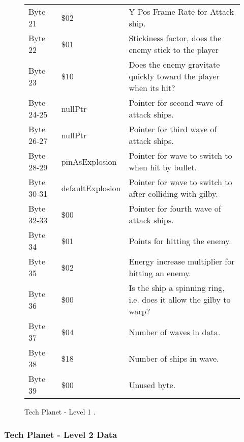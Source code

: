 \begin{figure}[H]
{\begin{adjustbox}{width=12cm}
\begin{tabular}{lll}
 Byte 21    & \$02               & Y Pos Frame Rate for Attack ship.                                   \\
 Byte 22    & \$01               & Stickiness factor, does the enemy stick to the player               \\
 Byte 23    & \$10               & Does the enemy gravitate quickly toward the player when its hit?    \\
 Byte 24-25 & nullPtr           & Pointer for second wave of attack ships.                            \\
 Byte 26-27 & nullPtr           & Pointer for third wave of attack ships.                             \\
 Byte 28-29 & pinAsExplosion    & Pointer for wave to switch to when hit by bullet.                   \\
 Byte 30-31 & defaultExplosion  & Pointer for  wave to switch to after colliding with gilby.          \\
 Byte 32-33 & \$00               & Pointer for fourth wave of attack ships.                            \\
 Byte 34    & \$01               & Points for hitting the enemy.                                       \\
 Byte 35    & \$02               & Energy increase multiplier for hitting an enemy.                    \\
 Byte 36    & \$00               & Is the ship a spinning ring, i.e. does it allow the gilby to warp?  \\
 Byte 37    & \$04               & Number of waves in data.                                            \\
 Byte 38    & \$18               & Number of ships in wave.                                            \\
 Byte 39    & \$00               & Unused byte.                                                        \\
\bottomrule
\end{tabular}

  \end{adjustbox}

  }\caption*{Tech Planet - Level 1
.}
\end{figure}

\clearpage
\subsubsection{Tech Planet - Level 2 Data}

